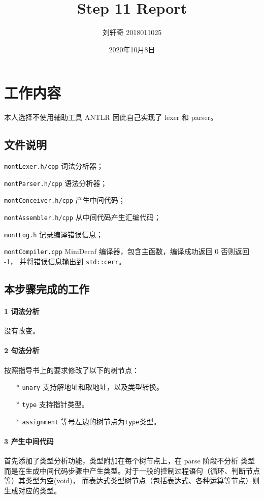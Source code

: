\documentclass[UTF8]{ctexart}
\title{Step 11 Report}
\author{刘轩奇 2018011025}
\date{2020年10月8日}
\newcommand{\T}[1]{\texttt{{#1}}}
\begin{document}
    \maketitle
    \section{工作内容}
        本人选择不使用辅助工具 ANTLR 因此自己实现了 lexer 和 parser。
        \subsection{文件说明} 
            \T{montLexer.h/cpp} 词法分析器；

            \T{montParser.h/cpp} 语法分析器；

            \T{montConceiver.h/cpp} 产生中间代码；

            \T{montAssembler.h/cpp} 从中间代码产生汇编代码；
            
            \T{montLog.h} 记录编译错误信息；

            \T{montCompiler.cpp} MiniDecaf 编译器，包含主函数，编译成功返回 0 否则返回 -1，
            并将错误信息输出到 \T{std::cerr}。
        
        \subsection{本步骤完成的工作}

            \paragraph{1 词法分析} 没有改变。

            \paragraph{2 句法分析} 按照指导书上的要求修改了以下的树节点：
            \begin{itemize}
                \item[*] \T{unary} 支持解地址和取地址，以及类型转换。
                \item[*] \T{type} 支持指针类型。
                \item[*] \T{assignment} 等号左边的树节点为\T{type}类型。
            \end{itemize}

            \paragraph{3 产生中间代码} 首先添加了类型分析功能，类型附加在每个树节点上，在 parse 阶段不分析
            类型而是在生成中间代码步骤中产生类型。对于一般的控制过程语句（循环、判断节点等）其类型为空(void)，
            而表达式类型树节点（包括表达式、各种运算等节点）则生成对应的类型。
            
\end{document}
